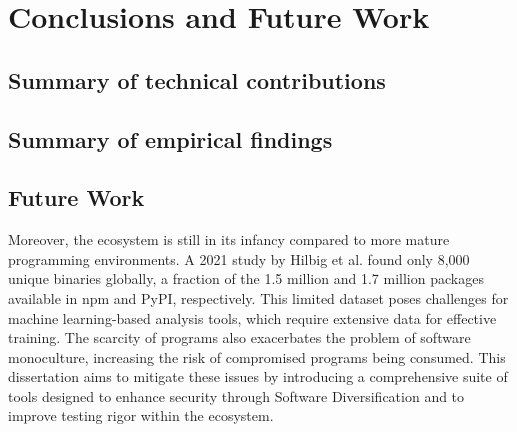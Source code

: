 
\chapter{Conclusions and Future Work}
\label{results}


\section{Summary of technical contributions}




\section{Summary of empirical findings}




\section{Future Work}


Moreover, the \Wasm ecosystem is still in its infancy compared to more mature programming environments. 
A 2021 study by Hilbig et al. found only 8,000 unique \Wasm binaries globally\cite{Hilbig2021AnES}, a fraction of the 1.5 million and 1.7 million packages available in npm and PyPI, respectively. 
This limited dataset poses challenges for machine learning-based analysis tools, which require extensive data for effective training. 
The scarcity of \Wasm programs also exacerbates the problem of software monoculture, increasing the risk of compromised \Wasm programs being consumed\cite{usenixWasm2020}. 
This dissertation aims to mitigate these issues by introducing a comprehensive suite of tools designed to enhance \Wasm security through Software Diversification and to improve testing rigor within the ecosystem.

